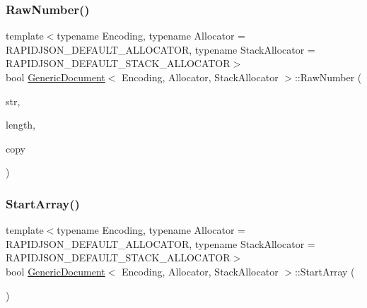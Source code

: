\subsubsection{\texorpdfstring{Raw\+Number()}{RawNumber()}}
{\footnotesize\ttfamily template$<$typename Encoding, typename Allocator = R\+A\+P\+I\+D\+J\+S\+O\+N\+\_\+\+D\+E\+F\+A\+U\+L\+T\+\_\+\+A\+L\+L\+O\+C\+A\+T\+OR, typename Stack\+Allocator = R\+A\+P\+I\+D\+J\+S\+O\+N\+\_\+\+D\+E\+F\+A\+U\+L\+T\+\_\+\+S\+T\+A\+C\+K\+\_\+\+A\+L\+L\+O\+C\+A\+T\+OR$>$ \\
bool \hyperlink{classGenericDocument}{Generic\+Document}$<$ Encoding, Allocator, Stack\+Allocator $>$\+::Raw\+Number (\begin{DoxyParamCaption}\item[{const \hyperlink{classGenericValue_ade0e0ce64ccd5d852da57a35e720bafb}{Ch} $\ast$}]{str,  }\item[{\hyperlink{rapidjson_8h_a5ed6e6e67250fadbd041127e6386dcb5}{Size\+Type}}]{length,  }\item[{bool}]{copy }\end{DoxyParamCaption})\hspace{0.3cm}{\ttfamily [inline]}}

\mbox{\label{classGenericDocument_ae12c513c61745ae731a47b1ca33db063}} 
\subsubsection{\texorpdfstring{Start\+Array()}{StartArray()}}
{\footnotesize\ttfamily template$<$typename Encoding, typename Allocator = R\+A\+P\+I\+D\+J\+S\+O\+N\+\_\+\+D\+E\+F\+A\+U\+L\+T\+\_\+\+A\+L\+L\+O\+C\+A\+T\+OR, typename Stack\+Allocator = R\+A\+P\+I\+D\+J\+S\+O\+N\+\_\+\+D\+E\+F\+A\+U\+L\+T\+\_\+\+S\+T\+A\+C\+K\+\_\+\+A\+L\+L\+O\+C\+A\+T\+OR$>$ \\
bool \hyperlink{classGenericDocument}{Generic\+Document}$<$ Encoding, Allocator, Stack\+Allocator $>$\+::Start\+Array (\begin{DoxyParamCaption}{ }\end{DoxyParamCaption})\hspace{0.3cm}{\ttfamily [inline]}}

\mbox{\label{classGenericDocument_abb1417fde52cc34cb340e3b50a3295da}} 
